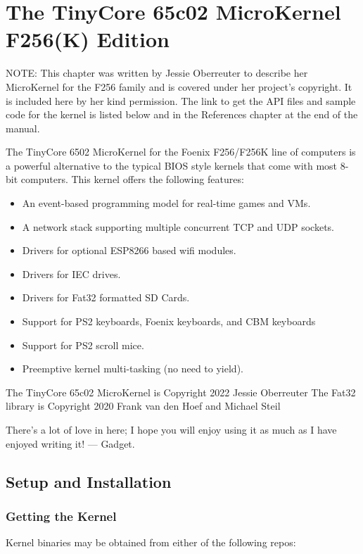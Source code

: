 \chapter{The TinyCore 65c02 MicroKernel F256(K) Edition}
\label{chp:kernel}

\begin{leftbar}
  NOTE: This chapter was written by Jessie Oberreuter to describe her MicroKernel for the F256 family and is covered under her project's copyright. It is included here by her kind permission. The link to get the API files and sample code for the kernel is listed below and in the References chapter at the end of the manual.
\end{leftbar}
  
The TinyCore 6502 MicroKernel for the Foenix F256/F256K line of computers is a powerful alternative to the typical BIOS style kernels that come with most 8-bit computers.  This kernel offers the following features:

\begin{itemize}
    \item An event-based programming model for real-time games and VMs.
    \item A network stack supporting multiple concurrent TCP and UDP sockets.
    \item Drivers for optional ESP8266 based wifi modules.
    \item Drivers for IEC drives.
    \item Drivers for Fat32 formatted SD Cards.
    \item Support for PS2 keyboards, Foenix keyboards, and CBM keyboards
    \item Support for PS2 scroll mice.
    \item Preemptive kernel multi-tasking (no need to yield). 
\end{itemize}

The TinyCore 65c02 MicroKernel is Copyright 2022 Jessie Oberreuter
The Fat32 library is Copyright 2020 Frank van den Hoef and Michael Steil  

There's a lot of love in here; I hope you will enjoy using it as much as I have enjoyed writing it! --- Gadget.

\section*{Setup and Installation}

\subsection*{Getting the Kernel}
Kernel binaries may be obtained from either of the following repos: 


